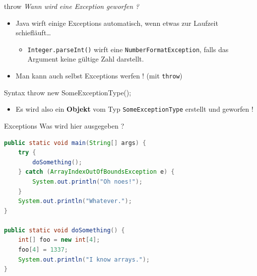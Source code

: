 \documentclass[18pt]{beamer}
\begin{document}
\begin{frame}[fragile]{throw}
    \textit{Wann wird eine Exception geworfen ?}
    \begin{itemize}
        \item Java wirft einige Exceptions automatisch, wenn etwas zur Laufzeit schiefläuft\dots
        \begin{itemize}
            \item \texttt{Integer.parseInt()} wirft eine \texttt{NumberFormatException}, falls das Argument keine gültige Zahl darstellt.
        \end{itemize}
        \item Man kann auch selbst Exceptions werfen ! (mit \texttt{throw})
    \end{itemize}

    \begin{exampleblock}{Syntax}
throw new SomeExceptionType();
    \end{exampleblock}

    \begin{itemize}
        \item Es wird also ein \textbf{Objekt} vom Typ \texttt{SomeExceptionType} erstellt und geworfen !
    \end{itemize}

\end{frame}


\begin{frame}[fragile]{Exceptions}
    Was wird hier ausgegeben ?
    \begin{exampleblock}{}
        \begin{lstlisting}[language=Java,basicstyle=\scriptsize]
public static void main(String[] args) {
    try {
        doSomething();
    } catch (ArrayIndexOutOfBoundsException e) {
        System.out.println("Oh noes!");
    }
    System.out.println("Whatever.");
}

public static void doSomething() {
    int[] foo = new int[4];
    foo[4] = 1337;
    System.out.println("I know arrays.");
}
        \end{lstlisting}

    \end{exampleblock}

\end{frame}
\end{document}
